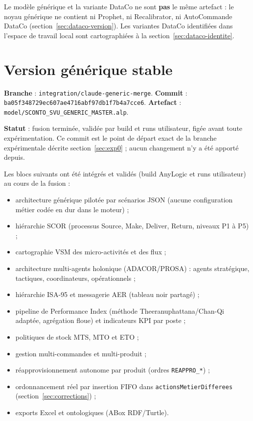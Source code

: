 \documentclass[11pt,a4paper]{article}
\newcommand{\code}[1]{\texttt{#1}}
\begin{document}
Le modèle générique et la variante DataCo ne sont \textbf{pas} le même
artefact : le noyau générique ne contient ni Prophet, ni Recalibrator, ni
AutoCommande DataCo (section~\ref{sec:dataco-version}). Les variantes
DataCo identifiées dans l'espace de travail local sont cartographiées à la
section~\ref{sec:dataco-identite}.

\section{Version générique stable}

\textbf{Branche} : \code{integration/\allowbreak claude-generic-merge}. \textbf{Commit} :
\code{ba05f348\allowbreak 729ec607\allowbreak ae4716ab\allowbreak f97db1f7\allowbreak b4a7cce6}. \textbf{Artefact} :
\code{model/\allowbreak SCONTO\_SVU\_\allowbreak GENERIC\_MASTER.alp}.

\textbf{Statut} : fusion terminée, validée par build et runs utilisateur,
figée avant toute expérimentation. Ce commit est le point de départ exact
de la branche expérimentale décrite section~\ref{sec:exp0} ; aucun
changement n'y a été apporté depuis.

Les blocs suivants ont été intégrés et validés (build AnyLogic et runs
utilisateur) au cours de la fusion :

\begin{itemize}
  \item architecture générique pilotée par scénarios JSON (aucune
        configuration métier codée en dur dans le moteur) ;
  \item hiérarchie SCOR (processus Source, Make, Deliver, Return, niveaux
        P1 à P5) ;
  \item cartographie VSM des micro-activités et des flux ;
  \item architecture multi-agents holonique (ADACOR/PROSA) : agents
        stratégique, tactiques, coordinateurs, opérationnels ;
  \item hiérarchie ISA-95 et messagerie AER (tableau noir partagé) ;
  \item pipeline de Performance Index (méthode Theeranuphattana/Chan-Qi
        adaptée, agrégation floue) et indicateurs KPI par poste ;
  \item politiques de stock MTS, MTO et ETO ;
  \item gestion multi-commandes et multi-produit ;
  \item réapprovisionnement autonome par produit (ordres \code{REAPPRO\_*}) ;
  \item ordonnancement réel par insertion FIFO dans \code{actionsMetierDifferees}
        (section~\ref{sec:corrections}) ;
  \item exports Excel et ontologiques (ABox RDF/Turtle).
\end{itemize}
\end{document}
